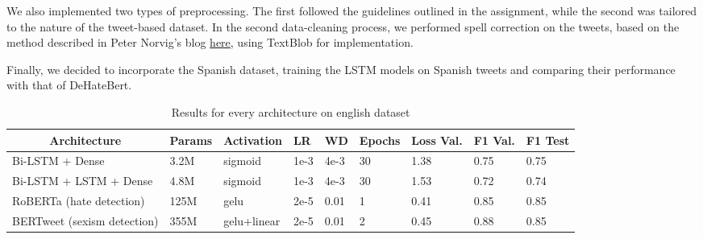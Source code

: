 \documentclass[11pt]{article}
\begin{document}
We also implemented two types of preprocessing. The first followed the guidelines outlined in the assignment, while the second was tailored to the nature of the tweet-based dataset. In the second data-cleaning process, we performed spell correction on the tweets, based on the method described in Peter Norvig's blog \href{https://norvig.com/spell-correct.html}{here}, using TextBlob for implementation.

Finally, we decided to incorporate the Spanish dataset, training the LSTM models on Spanish tweets and comparing their performance with that of DeHateBert.





\begin{table*}[!t]
\begin{tabular}{l|l|l|l|l|l|l|l|l}
\multicolumn{1}{c|}{\textbf{Architecture}} & \textbf{Params} & \textbf{Activation} & \textbf{LR} & \textbf{WD} & \textbf{Epochs} & \textbf{Loss Val.} & \textbf{F1 Val.} & \multicolumn{1}{c}{\textbf{F1 Test}} \\ \hline

Bi-LSTM + Dense		& 	3.2M	& sigmoid		& 1e-3	& 4e-3 	& 30 &  1.38  &	0.75 & 0.75 \\
Bi-LSTM + LSTM + Dense	& 		4.8M	& sigmoid		& 1e-3	& 4e-3	& 30 &	1.53 & 0.72 & 0.74\\
RoBERTa (hate detection)	&  125M	& gelu	& 2e-5	& 0.01		& 1	& 0.41 	& 0.85 & 0.85\\
BERTweet (sexism detection)	&  355M	& gelu+linear	& 2e-5	& 0.01	& 2	& 0.45  & 0.88 & 0.85\\

\end{tabular}
\caption{Results for every architecture on english dataset}
\end{table*}
\end{document}
